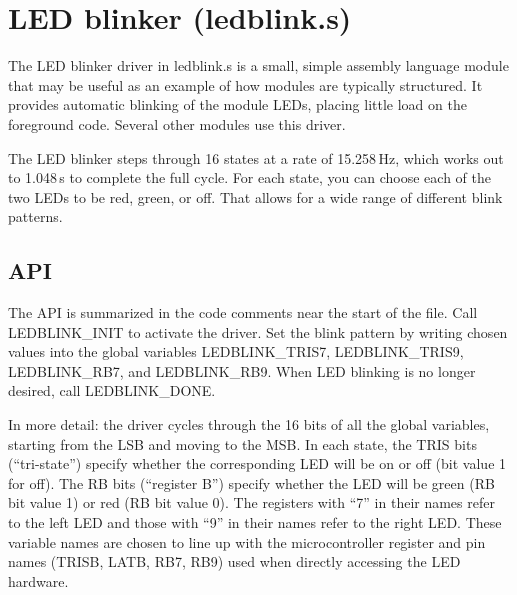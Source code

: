 
%
%
%
%
%
%

\chapter{LED blinker (ledblink.s)}

The LED blinker driver in ledblink.s is a small, simple assembly language
module that may be useful as an example of how modules are typically
structured.  It provides automatic blinking of the module LEDs, placing
little load on the foreground code.  Several other modules use this driver.

The LED blinker steps through 16 states at a rate of 15.258\,Hz, which
works out to 1.048\,s to complete the full cycle.  For each state, you can
choose each of the two LEDs to be red, green, or off.  That allows for a
wide range of different blink patterns.

\section{API}

The API is summarized in the code comments near the start of the file.  Call
LEDBLINK\_INIT to activate the driver.  Set the blink pattern by writing
chosen values into the global variables LEDBLINK\_TRIS7, LEDBLINK\_TRIS9,
LEDBLINK\_RB7, and LEDBLINK\_RB9.  When LED blinking is no longer desired,
call LEDBLINK\_DONE.

In more detail:  the driver cycles through the 16 bits of all the global
variables, starting from the LSB and moving to the MSB.  In each state, the
TRIS bits (``tri-state'') specify whether the corresponding LED will be on
or off (bit value 1 for off).  The RB bits (``register B'') specify whether
the LED will be green (RB bit value 1) or red (RB bit value 0).  The
registers with ``7'' in their names refer to the left LED and those with
``9'' in their names refer to the right LED.  These variable names are chosen
to line up with the microcontroller register and pin names (TRISB, LATB,
RB7, RB9) used when directly accessing the LED hardware.

